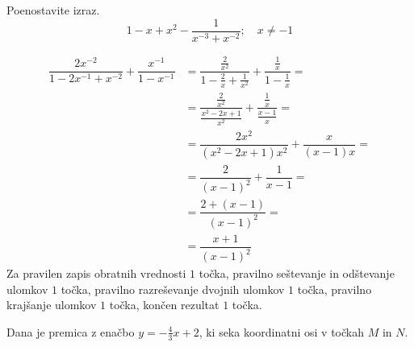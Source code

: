 \documentclass[addpoints]{exam}
\begin{document}
\begin{questions}

        \question[5]
        Poenostavite izraz.
            $$1-x+x^2-\dfrac{1}{x^{-3}+x^{-2}}; \quad x\neq -1$$
    
            \begin{solution}[4cm]
                \begin{align*}
                    \dfrac{2x^{-2}}{1-2x^{-1}+x^{-2}}+\dfrac{x^{-1}}{1-x^{-1}} &= \dfrac{\frac{2}{x^2}}{1-\frac{2}{x}+\frac{1}{x^2}}+\dfrac{\frac{1}{x}}{1-\frac{1}{x}}= \\
                                                                            &= \dfrac{\frac{2}{x^2}}{\frac{x^2-2x+1}{x^2}}+\dfrac{\frac{1}{x}}{\frac{x-1}{x}}= \\
                                                                            &= \dfrac{2x^2}{(x^2-2x+1)x^2}+\dfrac{x}{(x-1)x}= \\
                                                                            &= \dfrac{2}{(x-1)^2}+\dfrac{1}{x-1}= \\
                                                                            &= \dfrac{2+(x-1)}{(x-1)^2}= \\
                                                                            &= \dfrac{x+1}{(x-1)^2}
                \end{align*}
                Za pravilen zapis obratnih vrednosti $1$ točka, pravilno seštevanje in odštevanje ulomkov $1$ točka, pravilno razreševanje dvojnih ulomkov $1$ točka, pravilno krajšanje ulomkov $1$ točka, končen rezultat $1$ točka.
            \end{solution}
    










\newpage


    \question
    Dana je premica z enačbo $y=-\frac{4}{3}x+2$, ki seka koordinatni osi v točkah $M$ in $N$.

\end{questions}
\end{document}
